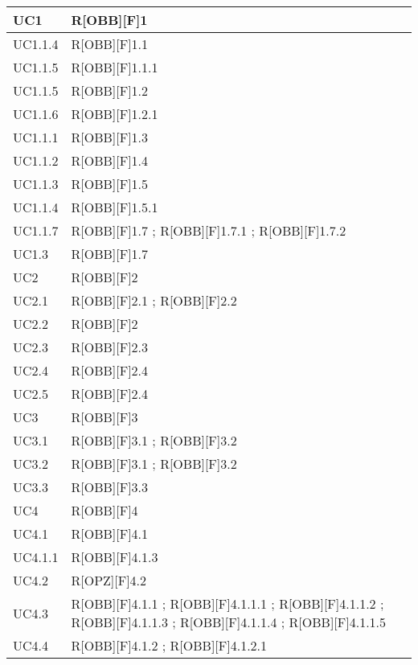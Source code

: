 	\begin{table}[H]
		\centering
		\begin{tabular}{|p{}|p{}|}
			\midrule
			
			UC1 & R[OBB][F]1 \\ \midrule
			UC1.1.4 & R[OBB][F]1.1 \\ \midrule
			UC1.1.5 & R[OBB][F]1.1.1 \\ \midrule
			UC1.1.5 & R[OBB][F]1.2 \\ \midrule
			UC1.1.6 & R[OBB][F]1.2.1 \\ \midrule
			UC1.1.1 & R[OBB][F]1.3 \\ \midrule
			UC1.1.2 & R[OBB][F]1.4 \\ \midrule
			UC1.1.3 & R[OBB][F]1.5 \\ \midrule
			UC1.1.4 & R[OBB][F]1.5.1 \\ \midrule
			UC1.1.7 & R[OBB][F]1.7 ; R[OBB][F]1.7.1 ; R[OBB][F]1.7.2 \\ \midrule
			UC1.3 & R[OBB][F]1.7 \\ \midrule
			UC2 & R[OBB][F]2 \\ \midrule
			UC2.1 & R[OBB][F]2.1 ; R[OBB][F]2.2 \\ \midrule
			UC2.2 & R[OBB][F]2 \\ \midrule
			UC2.3 & R[OBB][F]2.3 \\ \midrule
			UC2.4 & R[OBB][F]2.4 \\ \midrule
			UC2.5 & R[OBB][F]2.4 \\ \midrule
			UC3 & R[OBB][F]3 \\ \midrule
			UC3.1 & R[OBB][F]3.1 ; R[OBB][F]3.2 \\ \midrule
			UC3.2 & R[OBB][F]3.1 ; R[OBB][F]3.2 \\ \midrule
			UC3.3 & R[OBB][F]3.3 \\ \midrule
			UC4 & R[OBB][F]4 \\ \midrule
			UC4.1 & R[OBB][F]4.1 \\ \midrule
			UC4.1.1 & R[OBB][F]4.1.3 \\ \midrule
			UC4.2 & R[OPZ][F]4.2 \\ \midrule
			UC4.3 & R[OBB][F]4.1.1 ; R[OBB][F]4.1.1.1 ; R[OBB][F]4.1.1.2 ; R[OBB][F]4.1.1.3 ; R[OBB][F]4.1.1.4 ; R[OBB][F]4.1.1.5 \\ \midrule
			UC4.4 & R[OBB][F]4.1.2 ; R[OBB][F]4.1.2.1 \\ \midrule

		\end{tabular}
	\end{table}
	\newpage
	

